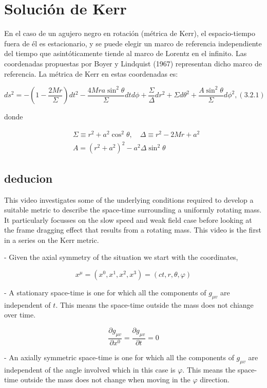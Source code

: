 \section{Solución de Kerr}
En el caso de un agujero negro en rotación (métrica de Kerr), el espacio-tiempo fuera de él es estacionario, y se puede elegir un marco de referencia independiente del tiempo que asintóticamente tiende al marco de Lorentz en el infinito. Las coordenadas propuestas por Boyer y Lindquist (1967) representan dicho marco de referencia. La métrica de Kerr en estas coordenadas es:

$$
    d s^2=-\left(1-\frac{2 M r}{\Sigma}\right) d t^2-\frac{4 M r a \sin ^2 \theta}{\Sigma} d t d \phi+\frac{\Sigma}{\Delta} d r^2+\Sigma d \theta^2+\frac{A \sin ^2 \theta}{\Sigma} d \phi^2,(3.2 .1)
$$

donde


\begin{align}
     & \Sigma \equiv r^2+a^2 \cos ^2 \theta, \quad \Delta \equiv r^2-2 M r+a^2 \\
     & A=\left(r^2+a^2\right)^2-a^2 \Delta \sin ^2 \theta
\end{align}

\subsection{deducion}
This video investigates some of the underlying conditions required to develop a suitable metric to describe the space-time surrounding a uniformly rotating mass. It particularly focusses on the slow speed and weak field case before looking at the frame dragging effect that results from a rotating mass.
This video is the first in a series on the Kerr metric.

- Given the axial symmetry of the situation we start with the coordinates,

$$
    x^\mu=\left(x^0, x^1, x^2, x^3\right)=(c t, r, \theta, \varphi)
$$

- A stationary space-time is one for which all the components of $g_{\mu v}$ are independent of $t$. This means the space-time outside the mass does not chiange over time.

$$
    \frac{\partial g_{\mu v}}{\partial x^0}=\frac{\partial g_{\mu v}}{\partial t}=0
$$

- An axially symmetric space-time is one for which all the components of $g_{\mu v}$ are independent of the angle involved which in this case is $\varphi$. This means the space-time outside the mass does not change when moving in the $\varphi$ direction.

